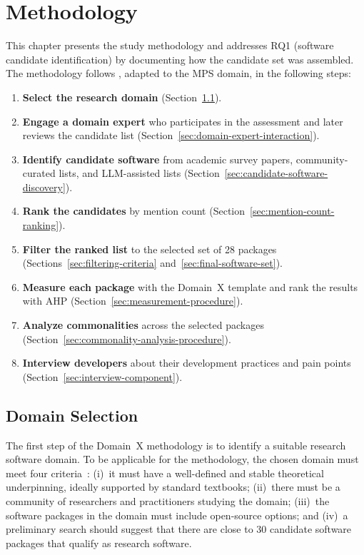 \chapter{Methodology}
\label{ch:methodology}

This chapter presents the study methodology and addresses RQ1 (software candidate identification) by documenting how the candidate set was assembled. The methodology follows \citet{Smith2021}, adapted to the MPS domain, in the following steps:

\begin{enumerate}
    \item \textbf{Select the research domain} (Section~\ref{sec:domain-selection}).
    \item \textbf{Engage a domain expert} who participates in the assessment and later reviews the candidate list (Section~\ref{sec:domain-expert-interaction}).
    \item \textbf{Identify candidate software} from academic survey papers, community-curated lists, and LLM-assisted lists (Section~\ref{sec:candidate-software-discovery}).
    \item \textbf{Rank the candidates} by mention count (Section~\ref{sec:mention-count-ranking}).
    \item \textbf{Filter the ranked list} to the selected set of 28 packages (Sections~\ref{sec:filtering-criteria} and~\ref{sec:final-software-set}).
    \item \textbf{Measure each package} with the Domain~X template and rank the results with AHP (Section~\ref{sec:measurement-procedure}).
    \item \textbf{Analyze commonalities} across the selected packages (Section~\ref{sec:commonality-analysis-procedure}).
    \item \textbf{Interview developers} about their development practices and pain points (Section~\ref{sec:interview-component}).
\end{enumerate}

\section{Domain Selection}
\label{sec:domain-selection}

The first step of the Domain~X methodology is to identify a suitable research software domain. To be applicable for the methodology, the chosen domain must meet four criteria~\citep{Smith2021}: (i)~it must have a well-defined and stable theoretical underpinning, ideally supported by standard textbooks; (ii)~there must be a community of researchers and practitioners studying the domain; (iii)~the software packages in the domain must include open-source options; and (iv)~a preliminary search should suggest that there are close to 30 candidate software packages that qualify as research software.

